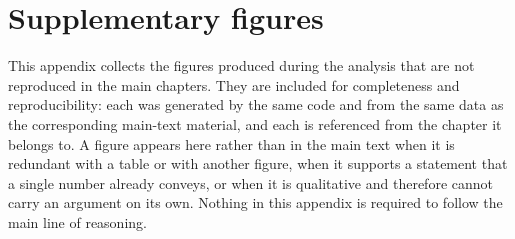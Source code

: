 %
%
%
%

\appendix

\chapter{Supplementary figures}
\label{app:figures}

This appendix collects the figures produced during the analysis that are not reproduced in the main chapters. They are included for completeness and reproducibility: each was generated by the same code and from the same data as the corresponding main-text material, and each is referenced from the chapter it belongs to. A figure appears here rather than in the main text when it is redundant with a table or with another figure, when it supports a statement that a single number already conveys, or when it is qualitative and therefore cannot carry an argument on its own. Nothing in this appendix is required to follow the main line of reasoning.


